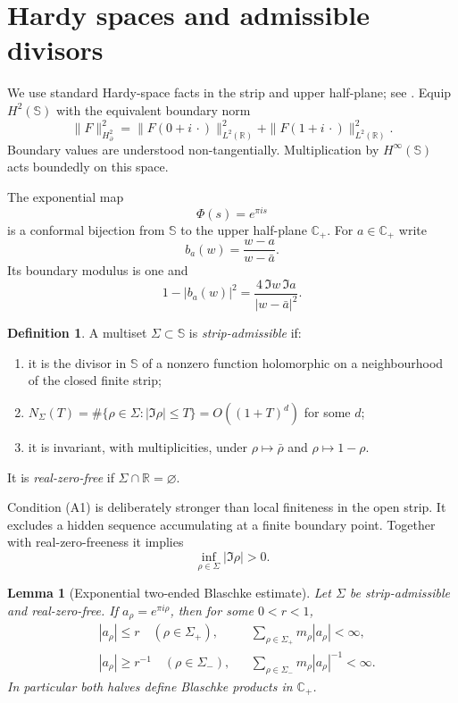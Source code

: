 \documentclass[11pt]{article}
\newtheorem{lemma}[theorem]{Lemma}
\theoremstyle{definition}
\newtheorem{definition}[theorem]{Definition}
\theoremstyle{remark}
\newcommand{\C}{\mathbb C}
\newcommand{\R}{\mathbb R}
\begin{document}
\section{Hardy spaces and admissible divisors}

We use standard Hardy-space facts in the strip and upper half-plane; see
\cite{Garnett2007,Nikolski2002}.  Equip $H^2(\mathbb S)$ with the equivalent
boundary norm
\[
 \|F\|_{H^2_\partial}^2
 =\|F(0+i\,\cdot)\|_{L^2(\R)}^2
  +\|F(1+i\,\cdot)\|_{L^2(\R)}^2.                    \tag{2.1}
\]
Boundary values are understood non-tangentially.  Multiplication by
$H^\infty(\mathbb S)$ acts boundedly on this space.

The exponential map
\[
        \Phi(s)=e^{\pi i s}                            \tag{2.2}
\]
is a conformal bijection from $\mathbb S$ to the upper half-plane $\C_+$.
For $a\in\C_+$ write
\[
        b_a(w)=\frac{w-a}{w-\bar a}.                   \tag{2.3}
\]
Its boundary modulus is one and
\[
 1-|b_a(w)|^2
 =\frac{4\,\Im w\,\Im a}{|w-\bar a|^2}.              \tag{2.4}
\]

\begin{definition}
A multiset $\Sigma\subset\mathbb S$ is \emph{strip-admissible} if:
\begin{enumerate}[label=\textup{(A\arabic*)}]
\item it is the divisor in $\mathbb S$ of a nonzero function holomorphic on a
      neighbourhood of the closed finite strip;
\item $N_\Sigma(T)=\#\{\rho\in\Sigma:|\Im\rho|\le T\}=O((1+T)^d)$ for some
      $d$;
\item it is invariant, with multiplicities, under $\rho\mapsto\bar\rho$ and
      $\rho\mapsto1-\rho$.
\end{enumerate}
It is \emph{real-zero-free} if $\Sigma\cap\R=\varnothing$.
\end{definition}

Condition (A1) is deliberately stronger than local finiteness in the open
strip.  It excludes a hidden sequence accumulating at a finite boundary point.
Together with real-zero-freeness it implies
\[
       \inf_{\rho\in\Sigma}|\Im\rho|>0.               \tag{2.5}
\]

\begin{lemma}[Exponential two-ended Blaschke estimate]
\label{lem:bl-sum}
Let $\Sigma$ be strip-admissible and real-zero-free.  If
$a_\rho=e^{\pi i\rho}$, then for some $0<r<1$,
\[
 \begin{aligned}
 &|a_\rho|\le r\quad(\rho\in\Sigma_+),
 &&\sum_{\rho\in\Sigma_+}m_\rho|a_\rho|<\infty,\\
 &|a_\rho|\ge r^{-1}\quad(\rho\in\Sigma_-),
 &&\sum_{\rho\in\Sigma_-}m_\rho|a_\rho|^{-1}<\infty.
 \end{aligned}                                         \tag{2.6}
\]
In particular both halves define Blaschke products in $\C_+$.
\end{lemma}
\end{document}
